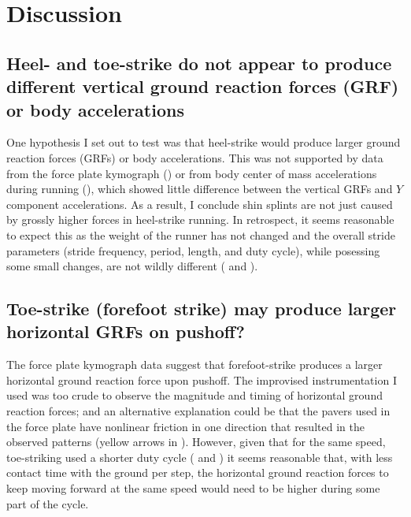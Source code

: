 \section{Discussion}
\label{sec:discussion}

\subsection{Heel- and toe-strike do not appear to produce different vertical ground reaction forces (GRF) or body accelerations}

One hypothesis I set out to test was that heel-strike would produce larger ground reaction forces (GRFs) or body accelerations. This was not supported by data from the force plate kymograph () or from body center of mass accelerations during running (), which showed little difference between the vertical GRFs and $Y$ component accelerations. As a result, I conclude shin splints are not just caused by grossly higher forces in heel-strike running. In retrospect, it seems reasonable to expect this as the weight of the runner has not changed and the overall stride parameters (stride frequency, period, length, and duty cycle), while posessing some small changes, are not wildly different ( and ). 



\subsection{Toe-strike (forefoot strike) may produce larger horizontal GRFs on pushoff?}

The force plate kymograph data suggest that forefoot-strike produces a larger horizontal ground reaction force upon pushoff. The improvised instrumentation I used was too crude to observe the magnitude and timing of horizontal ground reaction forces; and an alternative explanation could be that the pavers used in the force plate have nonlinear friction in one direction that resulted in the observed patterns (yellow arrows in ). However, given that for the same speed, toe-striking used a shorter duty cycle ( and ) it seems reasonable that, with less contact time with the ground per step, the horizontal ground reaction forces to keep moving forward at the same speed would need to be higher during some part of the cycle.



